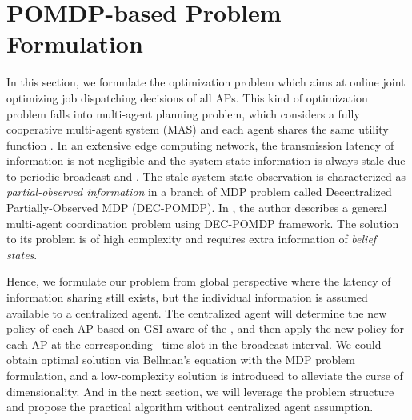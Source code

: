 \section{POMDP-based Problem Formulation}
In this section, we formulate the optimization problem which aims at online joint optimizing job dispatching decisions of all APs.
This kind of optimization problem falls into multi-agent planning problem, which considers a fully cooperative multi-agent system (MAS) and each agent shares the same utility function .
In an extensive edge computing network, the transmission latency of information is not negligible and the system state information is always stale due to periodic broadcast and \brlatency.
The stale system state observation is characterized as \emph{partial-observed information} in a branch of MDP problem called Decentralized Partially-Observed MDP (DEC-POMDP).
In , the author describes a general multi-agent coordination problem using DEC-POMDP framework. The solution to its problem is of high complexity and requires extra information of \emph{belief states}.

Hence, we formulate our problem from global perspective where the latency of information sharing still exists, but the individual information is assumed available to a centralized agent.
The centralized agent will determine the new policy of each AP based on GSI aware of the \brlatency, and then apply the new policy for each AP at the corresponding \brlatency~time slot in the broadcast interval.
We could obtain optimal solution via Bellman's equation with the MDP problem formulation, and  a low-complexity solution is introduced to alleviate the curse of dimensionality.
And in the next section, we will leverage the problem structure and propose the practical algorithm without centralized agent assumption.


